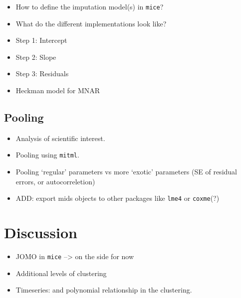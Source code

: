 \documentclass[
]{jss}
\begin{document}
\begin{itemize}
\item
  How to define the imputation model(s) in \texttt{mice}?
\item
  What do the different implementations look like?
\item
  Step 1: Intercept
\item
  Step 2: Slope
\item
  Step 3: Residuals
\item
  Heckman model for MNAR
\end{itemize}

\hypertarget{pooling}{%
\subsection{Pooling}\label{pooling}}

\begin{itemize}
\item
  Analysis of scientific interest.
\item
  Pooling using \texttt{mitml}.
\item
  Pooling `regular' parameters vs more `exotic' parameters (SE of
  residual errors, or autocorreletion)
\item
  ADD: export mids objects to other packages like \texttt{lme4} or
  \texttt{coxme}(?)
\end{itemize}

\hypertarget{discussion}{%
\section{Discussion}\label{discussion}}

\begin{itemize}
\item
  JOMO in \texttt{mice} --\textgreater{} on the side for now
\item
  Additional levels of clustering
\item
  Timeseries: and polynomial relationship in the clustering.
\end{itemize}

\renewcommand\refname{References}

\end{document}
